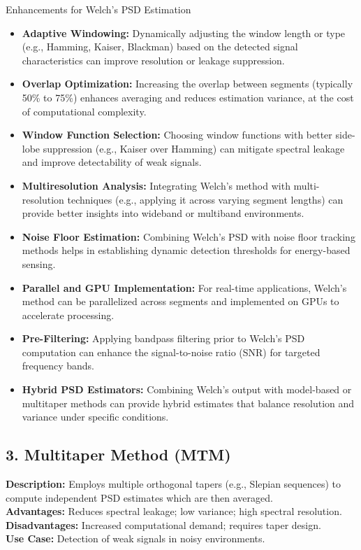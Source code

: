 \documentclass[10pt]{report}
\begin{document}
{Enhancements for Welch's PSD Estimation}
\begin{itemize}
	\item \textbf{Adaptive Windowing:} Dynamically adjusting the window length or type (e.g., Hamming, Kaiser, Blackman) based on the detected signal characteristics can improve resolution or leakage suppression.
	
	\item \textbf{Overlap Optimization:} Increasing the overlap between segments (typically 50\% to 75\%) enhances averaging and reduces estimation variance, at the cost of computational complexity.
	
	\item \textbf{Window Function Selection:} Choosing window functions with better side-lobe suppression (e.g., Kaiser over Hamming) can mitigate spectral leakage and improve detectability of weak signals.
	
	\item \textbf{Multiresolution Analysis:} Integrating Welch’s method with multi-resolution techniques (e.g., applying it across varying segment lengths) can provide better insights into wideband or multiband environments.
	
	\item \textbf{Noise Floor Estimation:} Combining Welch's PSD with noise floor tracking methods helps in establishing dynamic detection thresholds for energy-based sensing.
	
	\item \textbf{Parallel and GPU Implementation:} For real-time applications, Welch’s method can be parallelized across segments and implemented on GPUs to accelerate processing.
	
	\item \textbf{Pre-Filtering:} Applying bandpass filtering prior to Welch’s PSD computation can enhance the signal-to-noise ratio (SNR) for targeted frequency bands.
	
	\item \textbf{Hybrid PSD Estimators:} Combining Welch’s output with model-based or multitaper methods can provide hybrid estimates that balance resolution and variance under specific conditions.
\end{itemize}

\subsection*{3. Multitaper Method (MTM)}
\textbf{Description:} Employs multiple orthogonal tapers (e.g., Slepian sequences) to compute independent PSD estimates which are then averaged.\\
\textbf{Advantages:} Reduces spectral leakage; low variance; high spectral resolution.\\
\textbf{Disadvantages:} Increased computational demand; requires taper design.\\
\textbf{Use Case:} Detection of weak signals in noisy environments.
\end{document}
